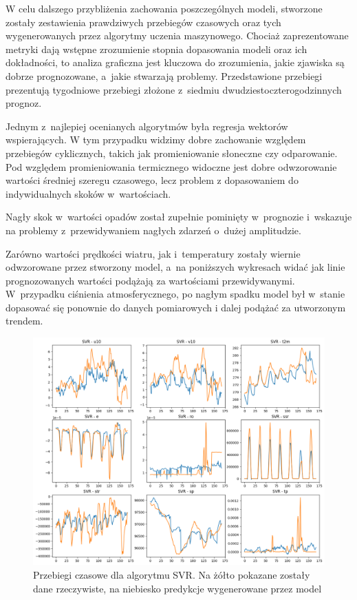 W celu dalszego przybliżenia zachowania poszczególnych modeli, stworzone zostały
zestawienia prawdziwych przebiegów czasowych oraz tych wygenerowanych przez algorytmy
uczenia maszynowego. Chociaż zaprezentowane metryki dają wstępne zrozumienie
stopnia dopasowania modeli oraz ich dokładności, to analiza graficzna jest kluczowa
do zrozumienia, jakie zjawiska są dobrze prognozowane, a~jakie stwarzają problemy.
Przedstawione przebiegi prezentują tygodniowe przebiegi złożone z~siedmiu 
dwudziestoczterogodzinnych prognoz.

\pagebreak

Jednym z~najlepiej ocenianych algorytmów była regresja wektorów wspierających.
W tym przypadku widzimy dobre zachowanie względem przebiegów cyklicznych, takich jak
promieniowanie słoneczne czy odparowanie. Pod względem promieniowania termicznego
widoczne jest dobre odwzorowanie wartości średniej szeregu czasowego, lecz problem
z dopasowaniem do indywidualnych skoków w~wartościach.

Nagły skok w~wartości opadów został zupełnie pominięty w~prognozie i~wskazuje 
na problemy z~przewidywaniem nagłych zdarzeń o~dużej amplitudzie. 

Zarówno wartości prędkości wiatru, jak i~temperatury zostały wiernie odwzorowane
przez stworzony model, a~na poniższych wykresach widać jak linie prognozowanych wartości
podążają za wartościami przewidywanymi. W~przypadku ciśnienia atmosferycznego,
po nagłym spadku model był w~stanie dopasować się ponownie do danych pomiarowych
i dalej podążać za utworzonym trendem.

\begin{figure}[H]
    \centering
    \includegraphics[width=\textwidth]{images/SVR_week.png}
    \caption{Przebiegi czasowe dla algorytmu SVR. Na żółto pokazane zostały dane 
    rzeczywiste, na niebiesko predykcje wygenerowane przez model}
    \label{svr-week}
\end{figure}

